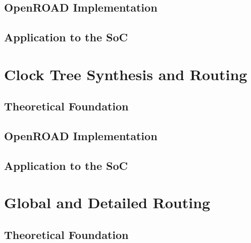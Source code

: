 \subsection{OpenROAD Implementation}

\subsection{Application to the SoC}

\section{Clock Tree Synthesis and Routing}

\subsection{Theoretical Foundation}

\subsection{OpenROAD Implementation}

\subsection{Application to the SoC}

\section{Global and Detailed Routing}

\subsection{Theoretical Foundation}

